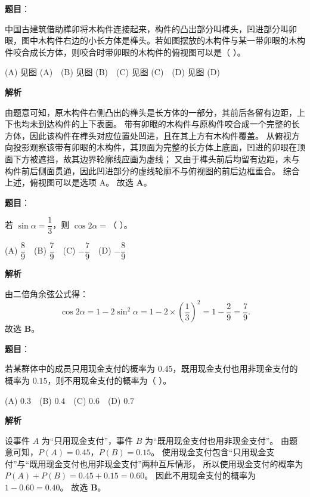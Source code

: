 \begin{answer}

\textbf{题目}：

中国古建筑借助榫卯将木构件连接起来，构件的凸出部分叫榫头，凹进部分叫卯眼，图中木构件右边的小长方体是榫头。若如图摆放的木构件与某一带卯眼的木构件咬合成长方体，则咬合时带卯眼的木构件的俯视图可以是（ ）。
\nopagebreak[4]
\begin{center}\end{center}
\nopagebreak[4]
(A) 见图 (A)　(B) 见图 (B)　(C) 见图 (C)　(D) 见图 (D)

\textbf{解析}

由题意可知，原木构件右侧凸出的榫头是长方体的一部分，其前后各留有边距，上下也均未到达构件的上下表面。
带有卯眼的木构件与原构件咬合成一个完整的长方体，因此该构件在榫头对应位置处凹进，且在其上方有木构件覆盖。
从俯视方向投影观察该带有卯眼的木构件，其顶面为完整的长方体上底面，凹进的卯眼在顶面下方被遮挡，故其边界轮廓线应画为虚线；
又由于榫头前后均留有边距，未与构件前后侧面贯通，因此凹进部分的虚线轮廓不与俯视图的前后边框重合。
综合上述，俯视图可以是选项 A。
故选 \textbf{A}。


\end{answer}
\begin{answer}

\textbf{题目}：

若 $\sin\alpha = \dfrac13$，则 $\cos 2\alpha =$（ ）。

(A) $\dfrac89$　(B) $\dfrac79$　(C) $-\dfrac79$　(D) $-\dfrac89$

\textbf{解析}

由二倍角余弦公式得：
\nopagebreak[4]
\[\cos 2\alpha = 1 - 2\sin^2\alpha = 1 - 2\times \left(\dfrac13\right)^2 = 1 - \dfrac29 = \dfrac79.\]
故选 \textbf{B}。


\end{answer}
\begin{answer}

\textbf{题目}：

若某群体中的成员只用现金支付的概率为 $0.45$，既用现金支付也用非现金支付的概率为 $0.15$，则不用现金支付的概率为（ ）。

(A) $0.3$　(B) $0.4$　(C) $0.6$　(D) $0.7$

\textbf{解析}

设事件 $A$ 为“只用现金支付”，事件 $B$ 为“既用现金支付也用非现金支付”。
由题意可知，$P(A) = 0.45$，$P(B) = 0.15$。
使用现金支付包含“只用现金支付”与“既用现金支付也用非现金支付”两种互斥情形，
所以使用现金支付的概率为 $P(A) + P(B) = 0.45 + 0.15 = 0.60$。
因此不用现金支付的概率为 $1 - 0.60 = 0.40$。
故选 \textbf{B}。


\end{answer}
